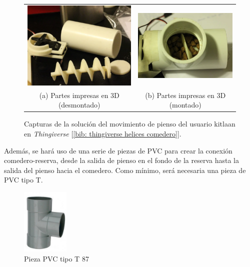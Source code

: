 \documentclass[12pt]{article}
\begin{document}
	\pagebreak
	
	\begin{figure}[h]
		\begin{center}
			\begin{tabular}{cc}
				\includegraphics[width=60mm]{img/thingiverse_helice_1.png} &   \includegraphics[width=60mm]{img/thingiverse_helice_2.png} \\
				(a) Partes impresas en 3D (desmontado) & (b) Partes impresas en 3D (montado)\\[6pt]
			\end{tabular}
			\caption{Capturas de la solución del movimiento de pienso del usuario kitlaan en \textit{Thingiverse} [\ref{bib: thingiverse helices comedero}].}
			\label{fig: capturas thingiverse helices kitlaan.}
		\end{center}
	\end{figure}
	
	\noindent Además, se hará uso de una serie de piezas de PVC para crear la conexión comedero-reserva, desde la salida de pienso en el fondo de la reserva hasta la salida del pienso hacia el comedero. Como mínimo, será necesaria una pieza de PVC tipo T.\\
	
	
	\begin{figure}[h!]
		\begin{center}
			\includegraphics[width=0.2\textwidth]{img/pieza_pvc_T.png}
			\caption{Pieza PVC tipo T 87\degree [\ref{bib: Nikoi ferreteria}]}
			\label{Pieza PVC T}
		\end{center}
	\end{figure}
	
\end{document}
